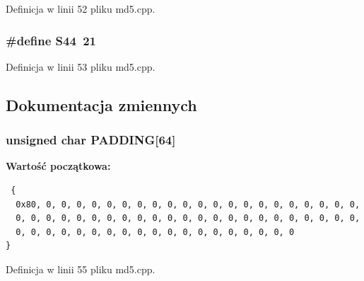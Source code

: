 Definicja w linii 52 pliku md5.cpp.\hypertarget{a00009_6a3989af72b55d169bd73a66f8620aae}{
\subsubsection[{S44}]{\setlength{\rightskip}{0pt plus 5cm}\#define S44~21}}
\label{da/da0/a00009_6a3989af72b55d169bd73a66f8620aae}




Definicja w linii 53 pliku md5.cpp.

\subsection{Dokumentacja zmiennych}
\hypertarget{a00009_ee6f420120b0fbc0fb096cb61655cec4}{
\subsubsection[{PADDING}]{\setlength{\rightskip}{0pt plus 5cm}unsigned char {\bf PADDING}\mbox{[}64\mbox{]}}}
\label{da/da0/a00009_ee6f420120b0fbc0fb096cb61655cec4}


\textbf{Wartość początkowa:}

\begin{Code}\begin{verbatim} {
  0x80, 0, 0, 0, 0, 0, 0, 0, 0, 0, 0, 0, 0, 0, 0, 0, 0, 0, 0, 0, 0, 0,
  0, 0, 0, 0, 0, 0, 0, 0, 0, 0, 0, 0, 0, 0, 0, 0, 0, 0, 0, 0, 0, 0, 0,
  0, 0, 0, 0, 0, 0, 0, 0, 0, 0, 0, 0, 0, 0, 0, 0, 0, 0, 0
}
\end{verbatim}
\end{Code}


Definicja w linii 55 pliku md5.cpp.